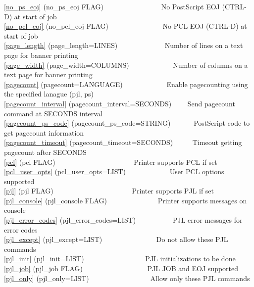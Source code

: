 \documentclass[a4paper]{article}
\begin{document}
{\ttfamily \ref{no_ps_eoj} {(no\_ps\_eoj FLAG)}}{\ttfamily ~~~~~~~~~~~~~~~~} No PostScript EOJ (CTRL-D) at start of job \\ 
{\ttfamily \ref{no_pcl_eoj} {(no\_pcl\_eoj FLAG)}}{\ttfamily ~~~~~~~~~~~~~~~} No PCL EOJ (CTRL-D) at start of job \\ 
{\ttfamily \ref{page_length} {(page\_length=LINES)}}{\ttfamily ~~~~~~~~~~~~~} Number of lines on a text page for banner printing \\ 
{\ttfamily \ref{page_width} {(page\_width=COLUMNS)}}{\ttfamily ~~~~~~~~~~~~} Number of columns on a text page for banner printing \\ 
{\ttfamily \ref{pagecount} {(pagecount=LANGUAGE)}}{\ttfamily ~~~~~~~~~~~~} Enable pagecounting using the specified lanague (pjl, ps) \\ 
{\ttfamily \ref{pagecount_interval} {(pagecount\_interval=SECONDS)}}{\ttfamily ~~~~} Send pagecount command at SECONDS interval \\ 
{\ttfamily \ref{pagecount_ps_code} {(pagecount\_ps\_code=STRING)}}{\ttfamily ~~~~~~} PostScript code to get pagecount information \\ 
{\ttfamily \ref{pagecount_timeout} {(pagecount\_timeout=SECONDS)}}{\ttfamily ~~~~~} Timeout getting pagecount after SECONDS \\ 
{\ttfamily \ref{pcl} {(pcl FLAG)}}{\ttfamily ~~~~~~~~~~~~~~~~~~~~~~} Printer supports PCL if set \\ 
{\ttfamily \ref{pcl_user_opts} {(pcl\_user\_opts=LIST)}}{\ttfamily ~~~~~~~~~~~~} User PCL options supported \\ 
{\ttfamily \ref{pjl} {(pjl FLAG)}}{\ttfamily ~~~~~~~~~~~~~~~~~~~~~~} Printer supports PJL if set \\ 
{\ttfamily \ref{pjl_console} {(pjl\_console FLAG)}}{\ttfamily ~~~~~~~~~~~~~~} Printer supports messages on console \\ 
{\ttfamily \ref{pjl_error_codes} {(pjl\_error\_codes=LIST)}}{\ttfamily ~~~~~~~~~~} PJL error messages for error codes \\ 
{\ttfamily \ref{pjl_except} {(pjl\_except=LIST)}}{\ttfamily ~~~~~~~~~~~~~~~} Do not allow these PJL commands \\ 
{\ttfamily \ref{pjl_init} {(pjl\_init=LIST)}}{\ttfamily ~~~~~~~~~~~~~~~~~} PJL initializations to be done \\ 
{\ttfamily \ref{pjl_job} {(pjl\_job FLAG)}}{\ttfamily ~~~~~~~~~~~~~~~~~~} PJL JOB and EOJ supported \\ 
{\ttfamily \ref{pjl_only} {(pjl\_only=LIST)}}{\ttfamily ~~~~~~~~~~~~~~~~~} Allow only these PJL commands \\ 
\end{document}
